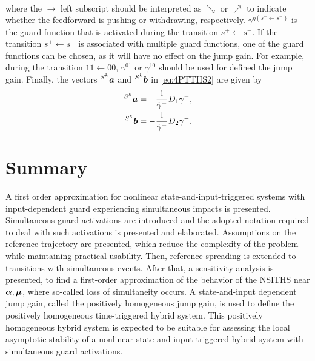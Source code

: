 \documentclass[../DC2017114Bouma.tex]{subfiles}
\begin{document}
\begin{sloppypar}
\begin{mydef}[PTTHS]
\begin{align*}
\end{align*}
where the $\rightarrow$ left subscript should be interpreted as $\searrow$ or $\nearrow$ to indicate whether the feedforward is pushing or withdrawing, respectively. $\gamma^{\eta(s^+\leftarrow s^-)}$ is the guard function that is activated during the transition $s^+\leftarrow s^-$. If the transition $s^+\leftarrow s^-$ is associated with multiple guard functions, one of the guard functions can be chosen, as it will have no effect on the jump gain. For example, during the transition $11\leftarrow 00$, $\gamma^{01}$ or $\gamma^{10}$ should be used for defined the jump gain. Finally, the vectors $\hspace{0cm}^{S^k}{\boldsymbol{a}}$ and $\hspace{0cm}^{S^k}{\boldsymbol{b}}$ in \eqref{eq:4PTTHS2} are given by
\begin{align*}
\hspace{0cm}^{S^k}{\boldsymbol{a}} &= -\frac{1}{\dot{\gamma}^{-}}D_1\gamma^{-},\\
\hspace{0cm}^{S^k}{\boldsymbol{b}} &= -\frac{1}{\dot{\gamma}^{-}}D_2\gamma^{-}.
\end{align*}
\end{mydef}
\end{sloppypar}

%
%
%
%
%
%

\section{Summary}
A first order approximation for nonlinear state-and-input-triggered systems with input-dependent guard experiencing simultaneous impacts is presented. Simultaneous guard activations are introduced and the adopted notation required to deal with such activations is presented and elaborated. Assumptions on the reference trajectory are presented, which reduce the complexity of the problem while maintaining practical usability. Then, reference spreading is extended to transitions with simultaneous events. After that, a sensitivity analysis is presented, to find a first-order approximation of the behavior of the NSITHS near $\boldsymbol{\alpha},\boldsymbol{\mu}$, where so-called loss of simultaneity occurs. A state-and-input dependent jump gain, called the positively homogeneous jump gain, is used to define the positively homogeneous time-triggered hybrid system. This positively homogeneous hybrid system is expected to be suitable for assessing the local asymptotic stability of a nonlinear state-and-input triggered hybrid system with simultaneous guard activations.
\end{document}

